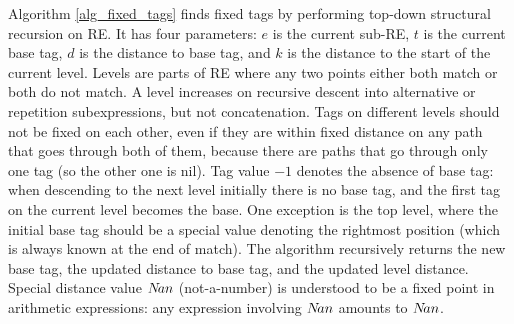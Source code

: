 \documentclass[]{article}
\begin{document}
Algorithm \ref{alg_fixed_tags} finds fixed tags by performing top-down structural recursion on RE.
It has four parameters: $e$ is the current sub-RE, $t$ is the current base tag,
$d$ is the distance to base tag, and $k$ is the distance to the start of the current level.
Levels are parts of RE where any two points either both match or both do not match.
A level increases on recursive descent into alternative or repetition subexpressions, but not concatenation.
Tags on different levels should not be fixed on each other, even if they are within fixed distance on any path that goes through both of them,
because there are paths that go through only one tag (so the other one is nil).
Tag value $-1$ denotes the absence of base tag: when descending to the next level initially there is no base tag, and the first tag on the current level becomes the base.
One exception is the top level, where the initial base tag should be a special value denoting the rightmost position (which is always known at the end of match).
The algorithm recursively returns the new base tag, the updated distance to base tag, and the updated level distance.
Special distance value $N\!an$ (not-a-number) is understood to be a fixed point in arithmetic expressions: any expression involving $N\!an$ amounts to $N\!an$.
\end{document}
